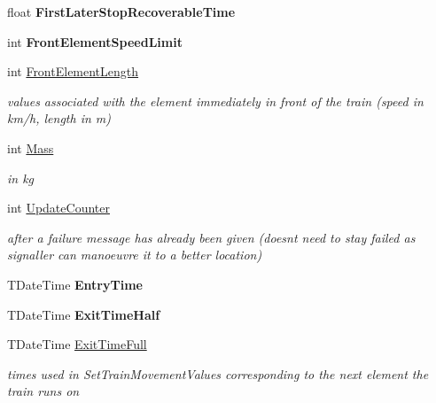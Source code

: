 \begin{DoxyCompactItemize}
\mbox{\label{class_t_train_a0188ccc7d6e918b6522a72addfb96d0d}} 
float {\bfseries First\+Later\+Stop\+Recoverable\+Time}
\item 
\mbox{\label{class_t_train_aa9d994b88696a8680438b109dccfd679}} 
int {\bfseries Front\+Element\+Speed\+Limit}
\item 
\mbox{\label{class_t_train_aac3a242d9fee653d2dca155d0279cc83}} 
int \mbox{\hyperlink{class_t_train_aac3a242d9fee653d2dca155d0279cc83}{Front\+Element\+Length}}
\begin{DoxyCompactList}\small\item\em values associated with the element immediately in front of the train (speed in km/h, length in m) \end{DoxyCompactList}\item 
\mbox{\label{class_t_train_ab9dabc7092d31bc27b573e75ac74d0da}} 
int \mbox{\hyperlink{class_t_train_ab9dabc7092d31bc27b573e75ac74d0da}{Mass}}
\begin{DoxyCompactList}\small\item\em in kg \end{DoxyCompactList}\item 
int \mbox{\hyperlink{class_t_train_ae57749c241ad7256c6f628faf1168ce7}{Update\+Counter}}
\begin{DoxyCompactList}\small\item\em after a failure message has already been given (doesn\textquotesingle{}t need to stay failed as signaller can manoeuvre it to a better location) \end{DoxyCompactList}\item 
\mbox{\label{class_t_train_a6baa340127335e185e91f150ab93986f}} 
T\+Date\+Time {\bfseries Entry\+Time}
\item 
\mbox{\label{class_t_train_a8e1741c26fe9887f84f1491d16e52f0d}} 
T\+Date\+Time {\bfseries Exit\+Time\+Half}
\item 
\mbox{\label{class_t_train_abe007893bd4ba34a70260734107d9cc4}} 
T\+Date\+Time \mbox{\hyperlink{class_t_train_abe007893bd4ba34a70260734107d9cc4}{Exit\+Time\+Full}}
\begin{DoxyCompactList}\small\item\em times used in Set\+Train\+Movement\+Values corresponding to the next element the train runs on \end{DoxyCompactList}\item 

\end{DoxyCompactItemize}
